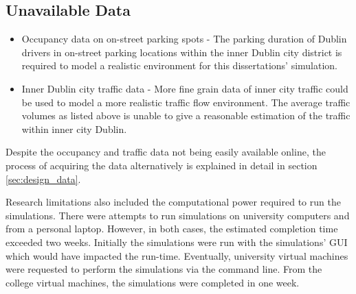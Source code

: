 \subsection*{Unavailable Data}
\begin{itemize}
    \item Occupancy data on on-street parking spots - The parking duration of Dublin drivers in on-street parking locations within the inner Dublin city district is required to model a realistic environment for this dissertations' simulation.
    \item Inner Dublin city traffic data - More fine grain data of inner city traffic could be used to model a more realistic traffic flow environment. The average traffic volumes as listed above is unable to give a reasonable estimation of the traffic within inner city Dublin.
\end{itemize}

Despite the occupancy and traffic data not being easily available online, the process of acquiring the data alternatively is explained in detail in section \ref{sec:design_data}.

Research limitations also included the computational power required to run the simulations. There were attempts to run simulations on university computers and from a personal laptop. However, in both cases, the estimated completion time exceeded two weeks. Initially the simulations were run with the simulations' GUI which would have impacted the run-time. Eventually, university virtual machines were requested to perform the simulations via the command line. From the college virtual machines, the simulations were completed in one week.